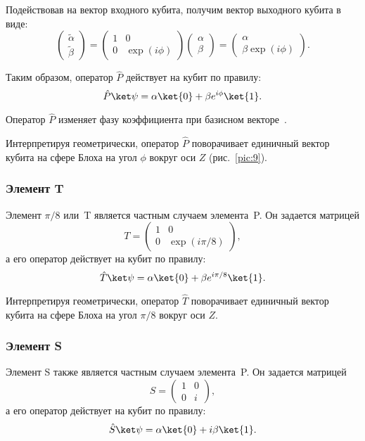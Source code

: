 \documentclass[pscyr,notitlepage]{hedwork}
\newcommand{\pic}[1]{\ref{pic:#1}}
\renewcommand{\~}[1]{\widetilde{#1}}
\begin{document}
  Подействовав на вектор входного кубита, получим вектор выходного кубита в
  виде:
  \[
    \begin{pmatrix}
      \~\alpha \\ \~\beta
    \end{pmatrix} =
    \begin{pmatrix}
      1 & 0 \\ 0 & \exp(i\phi)
    \end{pmatrix}
    \begin{pmatrix}
      \alpha \\ \beta
    \end{pmatrix} = 
    \begin{pmatrix}
      \alpha \\ \beta\exp(i\phi)
    \end{pmatrix}.
  \]
  
  Таким образом, оператор \( \hat{P} \) действует на кубит по правилу:
  \[
    \hat{P}\ket\psi = \alpha\ket{0} + \beta e^{i\phi}\ket{1}.
  \]
  
  Оператор \( \hat{P} \) изменяет фазу коэффициента при базисном
  векторе~.
  
  Интерпретируя геометрически, оператор \( \hat{P} \) поворачивает единичный
  вектор кубита на сфере Блоха на угол \( \phi \) вокруг оси \( Z \)
  (рис.~\pic{9}).~\cite{main,task}
  
  \subsubsection{Элемент T}
  
  Элемент \( \pi / 8 \) или~T является частным случаем элемента~P. Он
  задается матрицей
  \[
    T =
    \begin{pmatrix}
      1 & 0 \\ 0 & \exp(i\pi/8)
    \end{pmatrix},
  \]
  а его оператор действует на кубит по правилу:
  \[
    \hat{T}\ket\psi = \alpha\ket{0} + \beta e^{i\pi/8}\ket{1}.
  \]
  
  Интерпретируя геометрически, оператор \( \hat{T} \) поворачивает единичный
  вектор кубита на сфере Блоха на угол \( \pi / 8 \) вокруг оси
  \( Z \).~\cite{main}
  
  \subsubsection{Элемент S}
  
  Элемент S также является частным случаем элемента~P.
  Он задается матрицей
  \[
    S =
    \begin{pmatrix}
      1 & 0 \\ 0 & i
    \end{pmatrix},
  \]
  а его оператор действует на кубит по правилу:
  \[
    \hat{S}\ket\psi = \alpha\ket{0} + i\beta\ket{1}.
  \]
  
\end{document}
